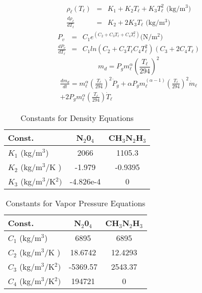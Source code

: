 \begin{eqnarray}
  \rho_\ell(T_\ell) & = &K_1 + K_2 T_\ell + K_3 T_\ell^2
  \mbox{  (kg/m$^3$)}\\
  \frac{d \rho_\ell}{dT_\ell } &  = & K_2 + 2K_3 T_\ell
  \mbox{  (kg/m$^3$)}
\end{eqnarray}
%
\begin{eqnarray}
  P_v & =  &\displaystyle C_1 e^{(C_2 + C_3 T_\ell + C_4 T_\ell^2)} \mbox{
  (N/m$^2$)}\\
  \frac{d P_v}{d T_\ell}& = &\displaystyle C_1 ln{(C_2 + C_3 T_\ell C_4 T_\ell^2)}\left(C_3 + 2C_4T_\ell\right)
\end{eqnarray}
%
\begin{equation}
    m_d = P_g m_\ell^\alpha\left( \frac{T_\ell}{294}\right)^2
\end{equation}
%
\begin{equation}\begin{split}
    \frac{d m_d}{dt} =  m_\ell^\alpha\left(
    \frac{T_\ell}{294}\right)^2\dot{P}_g + \alpha P_g m_\ell^{(\alpha - 1)}\left(
    \frac{T_\ell}{294}\right)^2 \dot{m}_\ell \\ + 2 P_g m_\ell^\alpha\left(
    \frac{T_\ell}{294}\right)\dot{T}_\ell
    \end{split}
\end{equation}
%

\begin{table} \centering
\caption{Constants for Density Equations}
\begin{tabular}{lcc}
  \hline
  Const. & \mbox{N}$_2$\mbox{0}$_4$ & CH$_3$N$_2$H$_3$ \\
  \hline \hline
  $K_1$ (kg/m$^3$) & 2066 & 1105.3 \\
  $K_2$ (kg/m$^3$/K )& -1.979 & -0.9395 \\
  $K_3$ (kg/m$^3$/K$^2) $ & -4.826e-4 & 0 \\
  \hline
\end{tabular}
\end{table}

\begin{table} \centering
\caption{Constants for Vapor Pressure Equations}
\begin{tabular}{lcc}
  \hline
  Const. & \mbox{N}$_2$\mbox{0}$_4$ & CH$_3$N$_2$H$_3$ \\
  \hline \hline
  $C_1$ (kg/m$^3$) & 6895 & 6895\\
  $C_2$ (kg/m$^3$/K )& 18.6742 & 12.4293 \\
  $C_3$ (kg/m$^3$/K$^2) $ & -5369.57 & 2543.37 \\
  $C_4$ (kg/m$^3$/K$^2) $ & 194721 & 0 \\
  \hline
\end{tabular}
\end{table}


